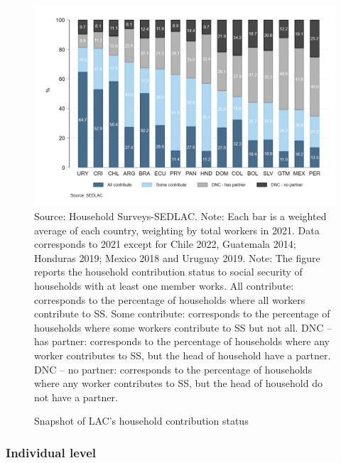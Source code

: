 \documentclass[english]{article}
\begin{document}
\begin{figure}[h!tbp]
    \justifying
     \caption{Snapshot of LAC’s household contribution status}     \includegraphics[scale=.3]{latex/figures/Household/snapshot_household.png}
    \label{fig:Householdlastyear}
    \footnotesize{Source: Household Surveys-SEDLAC.}
    \footnotesize{Note: Each bar is a weighted average of each country, weighting by total workers in 2021. Data corresponds to 2021 except for Chile 2022, Guatemala 2014; Honduras 2019; Mexico 2018 and Uruguay 2019.}
    \footnotesize{Note: The figure reports the household contribution status to social security of households with at least one member works.   All contribute: corresponds to the percentage of households where all workers contribute to SS. Some contribute: corresponds to the percentage of households where some workers contribute to SS but not all. DNC – has partner: corresponds to the percentage of households where any worker contributes to SS, but the head of household have a partner. DNC – no partner: corresponds to the percentage of households where any worker contributes to SS, but the head of household do not have a partner.}
\end{figure}

\subsubsection{Individual level} %
\end{document}
